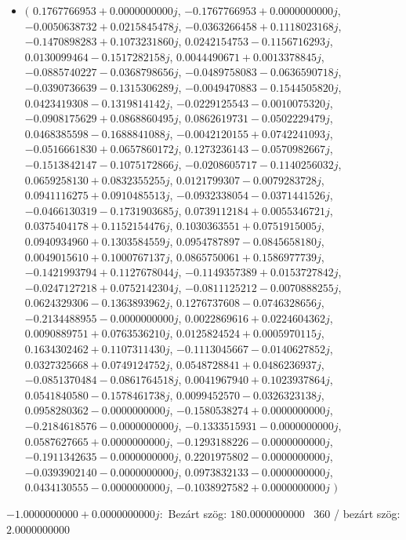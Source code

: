 \documentclass[14pt,a4paper]{article}
\begin{document}
\begin{itemize}
\item
$\big($
$0.1767766953+0.0000000000j$, $-0.1767766953+0.0000000000j$, $-0.0050638732+0.0215845478j$, $-0.0363266458+0.1118023168j$, $-0.1470898283+0.1073231860j$, $0.0242154753-0.1156716293j$, $0.0130099464-0.1517282158j$, $0.0044490671+0.0013378845j$, $-0.0885740227-0.0368798656j$, $-0.0489758083-0.0636590718j$, $-0.0390736639-0.1315306289j$, $-0.0049470883-0.1544505820j$, $0.0423419308-0.1319814142j$, $-0.0229125543-0.0010075320j$, $-0.0908175629+0.0868860495j$, $0.0862619731-0.0502229479j$, $0.0468385598-0.1688841088j$, $-0.0042120155+0.0742241093j$, $-0.0516661830+0.0657860172j$, $0.1273236143-0.0570982667j$, $-0.1513842147-0.1075172866j$, $-0.0208605717-0.1140256032j$, $0.0659258130+0.0832355255j$, $0.0121799307-0.0079283728j$, $0.0941116275+0.0910485513j$, $-0.0932338054-0.0371441526j$, $-0.0466130319-0.1731903685j$, $0.0739112184+0.0055346721j$, $0.0375404178+0.1152154476j$, $0.1030363551+0.0751915005j$, $0.0940934960+0.1303584559j$, $0.0954787897-0.0845658180j$, $0.0049015610+0.1000767137j$, $0.0865750061+0.1586977739j$, $-0.1421993794+0.1127678044j$, $-0.1149357389+0.0153727842j$, $-0.0247127218+0.0752142304j$, $-0.0811125212-0.0070888255j$, $0.0624329306-0.1363893962j$, $0.1276737608-0.0746328656j$, $-0.2134488955-0.0000000000j$, $0.0022869616+0.0224604362j$, $0.0090889751+0.0763536210j$, $0.0125824524+0.0005970115j$, $0.1634302462+0.1107311430j$, $-0.1113045667-0.0140627852j$, $0.0327325668+0.0749124752j$, $0.0548728841+0.0486236937j$, $-0.0851370484-0.0861764518j$, $0.0041967940+0.1023937864j$, $0.0541840580-0.1578461738j$, $0.0099452570-0.0326323138j$, $0.0958280362-0.0000000000j$, $-0.1580538274+0.0000000000j$, $-0.2184618576-0.0000000000j$, $-0.1333515931-0.0000000000j$, $0.0587627665+0.0000000000j$, $-0.1293188226-0.0000000000j$, $-0.1911342635-0.0000000000j$, $0.2201975802-0.0000000000j$, $-0.0393902140-0.0000000000j$, $0.0973832133-0.0000000000j$, $0.0434130555-0.0000000000j$, $-0.1038927582+0.0000000000j$
$\big)$
\end{itemize}
$-1.0000000000+0.0000000000j$:\
Bezárt szög: $180.0000000000$ \
360 / bezárt szög: $2.0000000000$\
\end{document}
